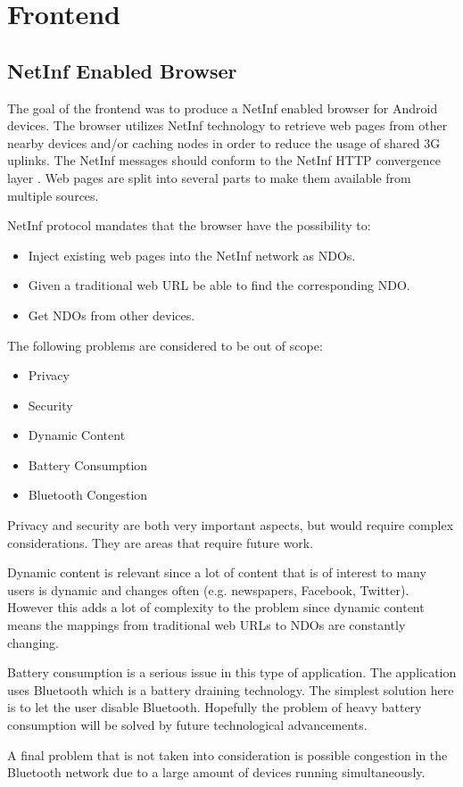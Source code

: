 \section{Frontend}

\subsection{NetInf Enabled Browser}

The goal of the frontend was to produce a NetInf enabled browser for Android devices. The browser utilizes NetInf technology to retrieve web pages from other nearby devices and/or caching nodes in order to reduce the usage of shared 3G uplinks. The NetInf messages should conform to the NetInf HTTP convergence layer \cite{netinfproto}. Web pages are split into several parts to make them available from multiple sources.

NetInf protocol mandates that the browser have the possibility to:

\begin{itemize}
	\item Inject existing web pages into the NetInf network as NDOs.
	\item Given a traditional web URL be able to find the corresponding NDO.
	\item Get NDOs from other devices.
\end{itemize}

The following problems are considered to be out of scope:

\begin{itemize}
	\item Privacy
	\item Security
	\item Dynamic Content
	\item Battery Consumption
	\item Bluetooth Congestion
\end{itemize}

Privacy and security are both very important aspects, but would require complex considerations. They are areas that require future work.

Dynamic content is relevant since a lot of content that is of interest to many users is dynamic and changes often (e.g. newspapers, Facebook, Twitter). However this adds a lot of complexity to the problem since dynamic content means the mappings from traditional web URLs to NDOs are constantly changing.

Battery consumption is a serious issue in this type of application. The application uses Bluetooth which is a battery draining technology. The simplest solution here is to let the user disable Bluetooth. Hopefully the problem of heavy battery consumption will be solved by future technological advancements.

A final problem that is not taken into consideration is possible congestion in the Bluetooth network due to a large amount of devices running simultaneously.
